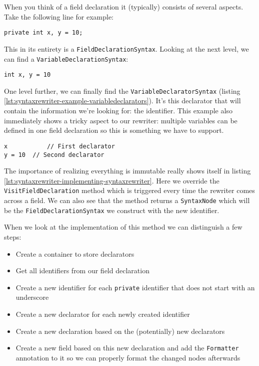 When you think of a field declaration it (typically) consists of several aspects. Take the following line for example: 

\begin{lstlisting}[label={lst:syntaxrewriter-example-fielddeclaration}]
private int x, y = 10;
\end{lstlisting}

This in its entirety is a \texttt{FieldDeclarationSyntax}. Looking at the next level, we can find a \texttt{VariableDeclarationSyntax}:

\begin{lstlisting}[label={lst:syntaxrewriter-example-variabledeclaration}]
int x, y = 10
\end{lstlisting}

One level further, we can finally find the \texttt{VariableDeclaratorSyntax} (listing \ref{lst:syntaxrewriter-example-variabledeclarators}). It's this declarator that will contain the information we're looking for: the identifier. This example also immediately shows a tricky aspect to our rewriter: multiple variables can be defined in one field declaration so this is something we have to support.

\begin{lstlisting}[label={lst:syntaxrewriter-example-variabledeclarators}]
x 			// First declarator
y = 10 	// Second declarator
\end{lstlisting}

The importance of realizing everything is immutable really shows itself in listing \ref{lst:syntaxrewriter-implementing-syntaxrewriter}. Here we override the \texttt{VisitFieldDeclaration} method which is triggered every time the rewriter comes across a field. We can also see that the method returns a \texttt{SyntaxNode} which will be the \texttt{FieldDeclarationSyntax} we construct with the new identifier.

When we look at the implementation of this method we can distinguish a few steps:

\begin{itemize}
\item Create a container to store declarators
\item Get all identifiers from our field declaration
\item Create a new identifier for each \texttt{private} identifier that does not start with an underscore
\item Create a new declarator for each newly created identifier
\item Create a new declaration based on the (potentially) new declarators
\item Create a new field based on this new declaration and add the \texttt{Formatter} annotation to it so we can properly format the changed nodes afterwards
\end{itemize}

